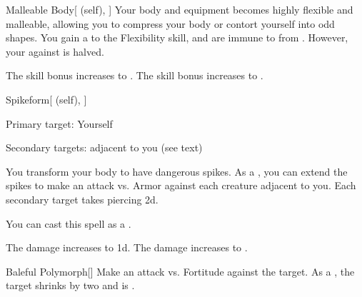 \lowercase{\hypertarget{spell:Malleable Body}{}}\label{spell:Malleable Body}
\begin{attuneability}[Rank 4]{\hypertarget{spell:Malleable Body}{Malleable Body}}[ (self), ]
Your body and equipment becomes highly flexible and malleable, allowing you to compress your body or contort yourself into odd shapes.
You gain a   to the Flexibility skill, and are immune to  from .
However, your  against  is halved.

\rankline
{} The skill bonus increases to .
 The skill bonus increases to .

\end{attuneability}
\vspace{0.25em}



\lowercase{\hypertarget{spell:Spikeform}{}}\label{spell:Spikeform}
\begin{attuneability}[Rank 4]{\hypertarget{spell:Spikeform}{Spikeform}}[ (self), ]

Primary target: Yourself
\par\noindent
Secondary targets:  adjacent to you (see text)

You transform your body to have dangerous spikes.
As a , you can extend the spikes to make an attack vs. Armor against each creature adjacent to you.
\hit Each secondary target takes piercing  \minus2d.

You can cast this spell as a .

\rankline
{} The damage increases to  \minus1d.
 The damage increases to .

\end{attuneability}
\vspace{0.25em}



\lowercase{\hypertarget{spell:Baleful Polymorph}{}}\label{spell:Baleful Polymorph}
\begin{freeability}[Rank 7]{\hypertarget{spell:Baleful Polymorph}{Baleful Polymorph}}[]
Make an attack vs. Fortitude against the target.
\hit As a , the target shrinks by two  and is .

\end{freeability}
\vspace{0.25em}



